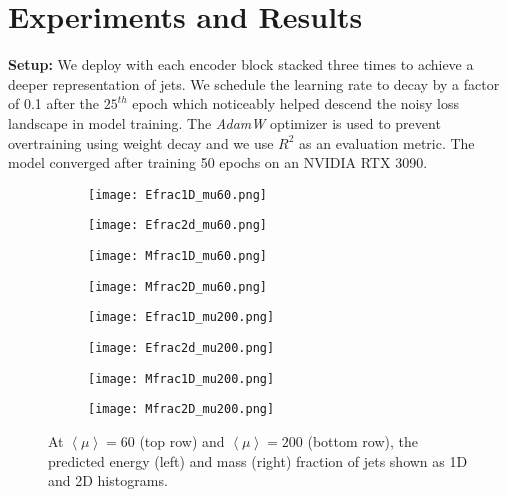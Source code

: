 \section{Experiments and Results}\hfill

\textbf{\myname{} Setup:} We deploy \myname{} with each encoder block stacked three times to achieve a deeper representation of jets. We schedule the learning rate to decay by a factor of 0.1 after the $25^{th}$ epoch which noticeably helped descend the noisy loss landscape in model training. The \emph{AdamW} optimizer is used to prevent overtraining using weight decay and we use $R^2$ as an evaluation metric. The model converged after training 50 epochs on an NVIDIA RTX 3090.\\

\begin{figure}[ht!]
\begin{subfigure}{.25\textwidth}
  \texttt{[image: Efrac1D\_mu60.png]}
  \caption{}
  \label{fig:Efrac1d_mu60}
\end{subfigure}%
\begin{subfigure}{.25\textwidth}
  \texttt{[image: Efrac2d\_mu60.png]}
  \caption{}
  \label{fig:Efrac2d_mu60}
\end{subfigure}
\begin{subfigure}{.25\textwidth}
  \texttt{[image: Mfrac1D\_mu60.png]}
  \caption{}
  \label{fig:Mfrac1d_mu60}
\end{subfigure}%
\begin{subfigure}{.25\textwidth}
  \texttt{[image: Mfrac2D\_mu60.png]}
  \caption{}
  \label{fig:Mfrac2d_mu60}
\end{subfigure}
\begin{subfigure}{.25\textwidth}
  \texttt{[image: Efrac1D\_mu200.png]}
  \caption{}
  \label{fig:Efrac1d_mu200}
\end{subfigure}%
\begin{subfigure}{.25\textwidth}
  \texttt{[image: Efrac2d\_mu200.png]}
  \caption{}
  \label{fig:Efrac2d_mu200}
\end{subfigure}
\begin{subfigure}{.25\textwidth}
  \texttt{[image: Mfrac1D\_mu200.png]}
  \caption{}
  \label{fig:Mfrac1d_mu200}
\end{subfigure}%
\begin{subfigure}{.25\textwidth}
  \texttt{[image: Mfrac2D\_mu200.png]}
  \caption{}
  \label{fig:Mfrac2d_mu200}
\end{subfigure}
\caption{At $\left \langle \mu \right \rangle=60$ (top row) and $\left \langle \mu \right \rangle=200$ (bottom row), the predicted energy (left) and mass (right) fraction of jets shown as 1D and 2D histograms.}
\label{fig:RegressionResults}
\end{figure}

